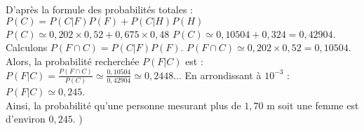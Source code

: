 {\begin{enumerate}
{			D'après la formule des probabilités totales :
			$P(C) = P(C|F)P(F) + P(C|H)P(H)$
			$P(C) \simeq 0{,}202 \times 0{,}52 + 0{,}675 \times 0{,}48$
			$P(C) \simeq 0{,}10504 + 0{,}324 = 0{,}42904$.\\
			
			Calculons $P(F \cap C) = P(C|F)P(F)$.
			$P(F \cap C) \simeq 0{,}202 \times 0{,}52 = 0{,}10504$.\\
			
			Alors, la probabilité recherchée $P(F|C)$ est :
			$P(F|C) = \frac{P(F \cap C)}{P(C)} \simeq \frac{0{,}10504}{0{,}42904} \simeq 0{,}2448...$
			En arrondissant à $10^{-3}$ : $P(F|C) \simeq 0{,}245$.\\
			
			Ainsi, la probabilité qu'une personne mesurant plus de $1{,}70$ m soit une femme est d'environ $0{,}245$.
		)
		}
	\end{enumerate}
	
}